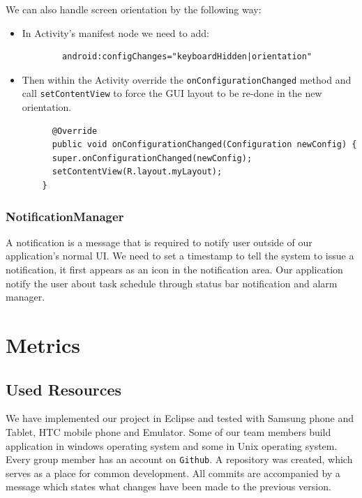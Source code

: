 \documentclass[10pt,a4paper]{report}
\begin{document}
We can also handle screen orientation by the following way:
\begin{itemize}
 \item In  Activity's manifest node we need to add: 
  \begin{verbatim}
 		android:configChanges="keyboardHidden|orientation"
   \end{verbatim}
   
  \item  Then within the Activity override the \texttt{onConfigurationChanged} method and call \texttt{setContentView} to force the GUI layout to be re-done in the new orientation.
  \begin{verbatim}
	  @Override
 	  public void onConfigurationChanged(Configuration newConfig) {
	  super.onConfigurationChanged(newConfig);
  	  setContentView(R.layout.myLayout);
	}
 \end{verbatim}
\end{itemize}

\subsection{NotificationManager}
A notification is a message that is required to notify user outside of our application's normal UI. We need to set a timestamp to tell the system to issue a notification, it first appears as an icon in the notification area. Our application notify the user about task schedule through status bar notification and alarm manager. 
 

 


\chapter{Metrics}

\section{Used Resources}

We have implemented our project in Eclipse and tested with Samsung phone and Tablet, HTC mobile phone and Emulator. Some of our team members build application in windows operating system and some in Unix operating system. \\

Every group member has an account on \texttt{Github}. A repository was created, which serves as a place for common development. All commits are accompanied by a message which states what changes have been made to the previous version.
\end{document}
